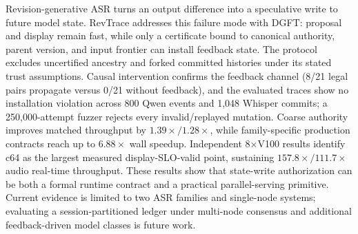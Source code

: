 Revision-generative ASR turns an output difference into a speculative write to
future model state. RevTrace addresses this failure mode with DGFT: proposal
and display remain fast, while only a certificate bound to canonical authority,
parent version, and input frontier can install feedback state. The protocol
excludes uncertified ancestry and forked committed histories under its stated
trust assumptions. Causal intervention confirms the feedback channel (8/21
legal pairs propagate versus 0/21 without feedback), and the evaluated traces
show no installation violation across 800 Qwen events and 1{,}048 Whisper
commits; a 250{,}000-attempt fuzzer rejects every invalid/replayed mutation.
Coarse authority improves matched throughput by $1.39\times/1.28\times$, while
family-specific production contracts reach up to $6.88\times$ wall speedup.
Independent 8$\times$V100 results identify c64 as the largest measured
display-SLO-valid point, sustaining $157.8\times/111.7\times$ audio real-time
throughput. These results show that state-write authorization can be both a
formal runtime contract and a practical parallel-serving primitive. Current
evidence is limited to two ASR families and single-node systems; evaluating a
session-partitioned ledger under multi-node consensus and additional
feedback-driven model classes is future work.
